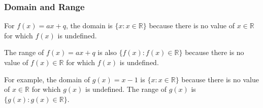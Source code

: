             \subsubsection{ Domain and Range}
            \nopagebreak
          \label{m39338*id238381}For $f\left(x\right)=ax+q$, the domain is $\{x:x\in \mathbb{R}\}$ because there is no value of $x\in \mathbb{R}$ for which $f\left(x\right)$ is undefined.\par 
          \label{m39338*id238474}The range of $f\left(x\right)=ax+q$ is also $\{f\left(x\right):f\left(x\right)\in \mathbb{R}\}$ because there is no value of $f\left(x\right)\in \mathbb{R}$ for which $f\left(x\right)$ is undefined.\par 
          \label{m39338*id238584}For example, the domain of $g\left(x\right)=x-1$ is $\{x:x\in \mathbb{R}\}$ because there is no value of $x\in \mathbb{R}$ for which $g\left(x\right)$ is undefined. The range of $g\left(x\right)$ is $\{g\left(x\right):g\left(x\right)\in \mathbb{R}\}$.\par 
        \label{m39338*uid84}

